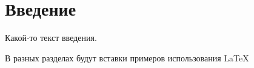 \section*{Введение}
%

Какой-то текст введения.

В разных разделах будут вставки примеров использования \LaTeX
